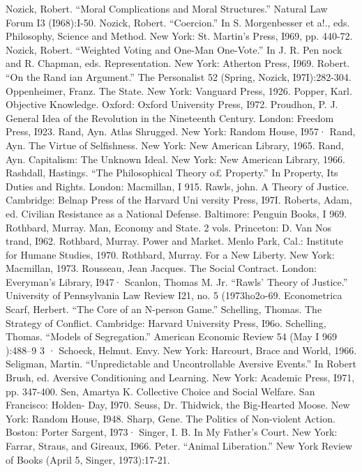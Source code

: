 \documentclass[11pt,openany]{book}
\begin{document}
{Nozick, Robert. ``Moral Complications and Moral Structures.'' Natural Law Forum I3 (I968):I-50. Nozick, Robert. ``Coercion.'' In S. Morgenbesser et a!., eds. Philosophy, Science and Method. New York: St. Martin's Press, I969, pp. 440-72. Nozick, Robert. ``Weighted Voting and One-Man One-Vote.'' In J. R. Pen nock and R. Chapman, eds. Representation. New York: Atherton Press, I969. Robert. ``On the Rand ian Argument.'' The Personalist 52 (Spring, Nozick, I97I):282-304. Oppenheimer, Franz. The State. New York: Vanguard Press, 1926. Popper, Karl. Objective Knowledge. Oxford: Oxford University Press, I972. Proudhon, P. J. General Idea of the Revolution in the Nineteenth Century. London: Freedom Press, I923. Rand, Ayn. Atlas Shrugged. New York: Random House, I957· Rand, Ayn. The Virtue of Selfishness. New York: New American Library, 1965. Rand, Ayn. Capitalism: The Unknown Ideal. New York: New American Library, 1966. Rashdall, Hastings. ``The Philosophical Theory o£ Property.'' In Property, Its Duties and Rights. London: Macmillan, I 915. Rawls, john. A Theory of Justice. Cambridge: Belnap Press of the Harvard Uni versity Press, I97I. Roberts, Adam, ed. Civilian Resistance as a National Defense. Baltimore: Penguin Books, I 969. Rothbard, Murray. Man, Economy and State. 2 vols. Princeton: D. Van Nos trand, I962. Rothbard, Murray. Power and Market. Menlo Park, Cal.: Institute for Humane Studies, 1970. Rothbard, Murray. For a New Liberty. New York: Macmillan, 1973. Rousseau, Jean Jacques. The Social Contract. London: Everyman's Library, I947· Scanlon, Thomas M. Jr. ``Rawls' Theory of Justice.'' University of Pennsylvania Law Review I21, no. 5 (1973ho2o-69. Econometrica Scarf, Herbert. ``The Core of an N-person Game.'' Schelling, Thomas. The Strategy of Conflict. Cambridge: Harvard University Press, I96o. Schelling, Thomas. ``Models of Segregation.'' American Economic Review 54 (May I 969 ):488--9 3 · Schoeck, Helmut. Envy. New York: Harcourt, Brace and World, 1966. Seligman, Martin. ``Unpredictable and Uncontrollable Aversive Events.'' In Robert Brush, ed. Aversive Conditioning and Learning. New York: Academic Press, I971, pp. 347-400. Sen, Amartya K. Collective Choice and Social Welfare. San Francisco: Holden- Day, I970. Seuss, Dr. Thidwick, the Big-Hearted Moose. New York: Random House, I948. Sharp, Gene. The Politics of Non-violent Action. Boston: Porter Sargent, I973· Singer, I. B. In My Father's Court. New York: Farrar, Straus, and Gireaux, I966. Peter. ``Animal Liberation.'' New York Review of Books (April 5, Singer, 1973):17-21.\par

}
\end{document}
